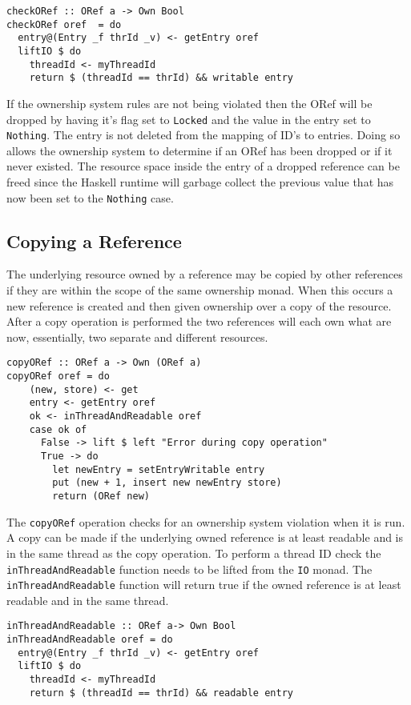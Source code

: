 \documentclass[onehalf,11pt]{beavtex}
\begin{document}
\begin{verbatim}
checkORef :: ORef a -> Own Bool
checkORef oref  = do
  entry@(Entry _f thrId _v) <- getEntry oref
  liftIO $ do
    threadId <- myThreadId
    return $ (threadId == thrId) && writable entry
\end{verbatim}

If the ownership system rules are not being violated then the ORef will be
dropped by having it's flag set to \texttt{Locked} and the value in the
entry set to \texttt{Nothing}. The entry is not deleted from the mapping of
ID's to entries. Doing so allows the ownership system to determine if an ORef
has been dropped or if it never existed.
The resource space inside the entry of a dropped reference can be freed since
the Haskell runtime will garbage collect the previous value that has now been
set to the \texttt{Nothing} case.

\subsection{Copying a Reference}

The underlying resource owned by a reference may be copied by other references
if they are within the scope of the same ownership monad.  When this occurs a new
reference is created and then given ownership over a copy of the resource.
After a copy operation is performed the two references will each own what are now,
essentially, two separate and different resources.

\begin{verbatim}
copyORef :: ORef a -> Own (ORef a)
copyORef oref = do
    (new, store) <- get
    entry <- getEntry oref
    ok <- inThreadAndReadable oref
    case ok of
      False -> lift $ left "Error during copy operation"
      True -> do
        let newEntry = setEntryWritable entry
        put (new + 1, insert new newEntry store)
        return (ORef new)
\end{verbatim}

The \texttt{copyORef} operation checks for an ownership system violation when
it is run.
A copy can be made if the underlying owned reference is at least readable and
is in the same thread as the copy operation.
To perform a thread ID check the \texttt{inThreadAndReadable} function
needs to be lifted from the \texttt{IO} monad.
The \texttt{inThreadAndReadable} function will return true if the owned reference
is at least readable and in the same thread.

\begin{verbatim}
inThreadAndReadable :: ORef a-> Own Bool
inThreadAndReadable oref = do
  entry@(Entry _f thrId _v) <- getEntry oref
  liftIO $ do
    threadId <- myThreadId
    return $ (threadId == thrId) && readable entry
\end{verbatim}
\end{document}
